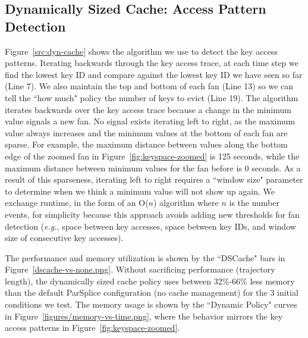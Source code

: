 \subsection{Dynamically Sized Cache: Access Pattern Detection}
\label{sec:regime-detection}

Figure~\ref{src:dyn-cache} shows the algorithm we use to detect the key access
patterns. Iterating backwards through the key access trace, at each time step we
find the lowest key ID and compare against the lowest key ID we have seen so
far (Line 7). We also maintain the top and bottom of each fan (Line 13) so we
can tell the ``how much" policy the number of keys to evict (Line 19).  The
algorithm iterates backwards over the key access trace because a change in the
minimum value signals a new fan. No signal exists iterating left to right, as
the maximum value always increases and the minimum values at the bottom of each
fan are sparse.  For example, the maximum distance between values along the
bottom edge of the zoomed fan in Figure~\ref{fig:keyspace-zoomed} is 125
seconds, while the maximum distance between minimum values for the fan before
is 0 seconds. As a result of this sparseness, iterating left to right requires
a ``window size" parameter to determine when we think a minimum value will not
show up again.  We exchange runtime, in the form of an O(\(n\)) algorithm where
\(n\) is the number events, for simplicity because this approach avoids adding
new thresholds for fan detection ({\it e.g.}, space between key accesses, space
between key IDs, and window size of consecutive key accesses).

The performance and memory utilization is shown by the ``DSCache" bars in
Figure~\ref{dscache-vs-none.png}. Without sacrificing performance (trajectory
length), the dynamically sized cache policy uses between 32\%-66\% less memory
than the default ParSplice configuration (no cache management) for the 3
initial conditions we test. The memory usage is shown by the ``Dynamic Policy"
curves in Figure~\ref{figures/memory-vs-time.png}, where the behavior mirrors
the key access patterns in Figure~\ref{fig:keyspace-zoomed}.


